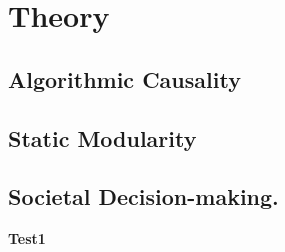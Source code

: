 \documentclass{article}
\begin{document}
\tableofcontents
\newpage

	\section{Theory}
	\subsection{Algorithmic Causality}
	\subsection{Static Modularity}
	\subsection{Societal Decision-making.}

\textbf{Test1} %

\end{document}

